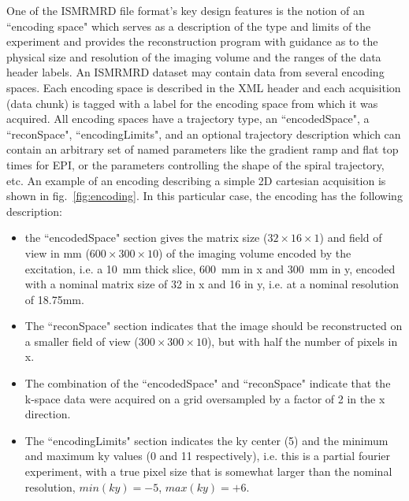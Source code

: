 \documentclass[12pt]{article}
\begin{document}
One of the ISMRMRD file format's key design features is the notion of an ``encoding space" which serves as a description of the type and limits of the experiment and provides the reconstruction program with guidance as to the physical size and resolution of the imaging volume and the ranges of the data header labels.  An ISMRMRD dataset may contain data from several encoding spaces.  Each encoding space is described in the XML header and each acquisition (data chunk) is tagged with a label for the encoding space from which it was acquired. All encoding spaces have a trajectory type, an ``encodedSpace", a ``reconSpace", ``encodingLimits", and an optional trajectory description which can contain an arbitrary set of named parameters like the gradient ramp and flat top times for EPI, or the parameters controlling the shape of the spiral trajectory, etc.  An example of an encoding describing a simple 2D cartesian acquisition is shown in fig.~\ref{fig:encoding}.  In this particular case, the encoding has the following description:
\begin{itemize}
\item the ``encodedSpace" section gives the matrix size ($32\times16\times1$) and field of view in mm ($600\times300\times10$) of the imaging volume encoded by the excitation, i.e. a 10~mm thick slice, 600~mm in x and 300~mm in y, encoded with a nominal matrix size of 32 in x and 16 in y, i.e. at a nominal resolution of 18.75mm.
\item The ``reconSpace" section indicates that the image should be reconstructed on a smaller field of view ($300\times300\times10$), but with half the number of pixels in x.
\item The combination of the ``encodedSpace" and ``reconSpace" indicate that the k-space data were acquired on a grid oversampled by a factor of 2 in the x direction.
\item The ``encodingLimits" section indicates the ky center (5) and the minimum and maximum ky values (0 and 11 respectively), i.e. this is a partial fourier experiment, with a true pixel size that is somewhat larger than the nominal resolution, $min(ky)=-5$, $max(ky)=+6$.
\end{itemize}
\end{document}
